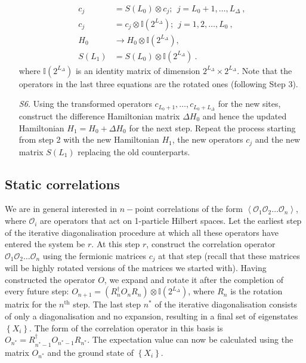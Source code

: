 \begin{itemize}
	\begin{equation}\begin{aligned}
		c_j &= S(L_0) \otimes c_j;~~j=L_0 +1, \ldots, L_\Delta~,\\
		c_j &= c_j \otimes \mathbb{I}(2^{L_\Delta});~ ~ j=1, 2, \ldots, L_0~,\\
		H_0 &\to H_0 \otimes \mathbb{I}(2^{L_\Delta}),\\
		S(L_1) &= S(L_0) \otimes \mathbb{I}(2^{L_\Delta})~.
	\end{aligned}\end{equation}
	where \(\mathbb{I}(2^{L_\Delta})\) is an identity matrix of dimension \(2^{L_\Delta} \times 2^{L_\Delta}\). Note that the operators in the last three equations are the rotated ones (following Step 3).
\item[{\it S6.}] Using the transformed operators \(c_{L_0+1},\ldots,c_{L_0 + L_\Delta}\) for the new sites, construct the difference Hamiltonian matrix \(\Delta H_0\) and hence the updated Hamiltonian \(H_1 = H_0 + \Delta H_0\) for the next step. Repeat the process starting from step 2 with the new Hamiltonian \(H_1\), the new operators \(c_j\) and the new matrix \(S(L_1)\) replacing the old counterparts.
\end{itemize}

\subsection{Static correlations}
We are in general interested in \(n-\)point correlations of the form \(\left<\mathcal{O}_1 \mathcal{O}_2 \ldots \mathcal{O}_n\right>\), where \(\mathcal{O}_i\) are operators that act on 1-particle Hilbert spaces. Let the earliest step of the iterative diagonalisation procedure at which all these operators have entered the system be \(r\). At this step \(r\), construct the correlation operator \(\mathcal{O}_1 \mathcal{O}_2 \ldots \mathcal{O}_n\) using the fermionic matrices \(c_j\) at that step (recall that these matrices will be highly rotated versions of the matrices we started with). Having constructed the operator \(O\), we expand and rotate it after the completion of every future step: \(O_{n+1} = (R_n^\dagger O_n R_n)\otimes \mathbb{I}(2^{L_\Delta})\), where \(R_n\) is the rotation matrix for the \(n^\text{th}\) step. The last step \(n^*\) of the iterative diagonalisation consists of only a diagonalisation and no expansion, resulting in a final set of eigenstates \(\left\{ X_i \right\} \). The form of the correlation operator in this basis is \(O_{n^*} = R^\dagger_{n^*-1} O_{n^*-1} R_{n^*}\). The expectation value can now be calculated using the matrix \(O_{n^*}\) and the ground state of \(\left\{ X_i \right\} \).

